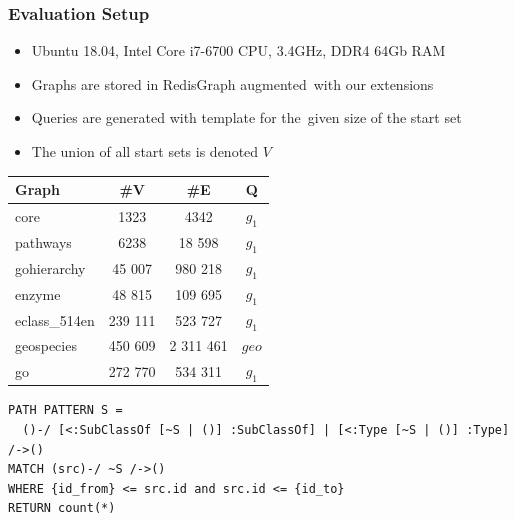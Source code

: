 \documentclass[xcolor=table,aspectratio=169]{beamer}
\begin{document}
\begin{frame}[fragile] \frametitle{Evaluation Setup}

\begin{minipage}[t]{0.51\textwidth}
\vspace{-2cm}
\begin{itemize}
  \item Ubuntu 18.04, Intel Core i7-6700 CPU, 3.4GHz, DDR4 64Gb RAM
  \item Graphs are stored in RedisGraph augmented~with our extensions
  \item Queries are generated with template for the~given size of the start set
  \item The union of all start sets is denoted $V$
\end{itemize}

\end{minipage}
\pause
\begin{minipage}[t]{0.44\textwidth}
{
\begin{tabular}{|l|c|c|c|}
\hline
Graph                  & \#V                  & \#E                  & Q     \\

\hline
\hline
core                   & 1323                 & 4342                 & $g_1$ \\
pathways               & 6238                 & 18 598               & $g_1$ \\
gohierarchy            & 45 007               & 980 218              & $g_1$ \\
enzyme                 & 48 815               & 109 695              & $g_1$ \\
eclass\_514en          & 239 111              & 523 727              & $g_1$ \\
geospecies             & 450 609              & 2 311 461            & $geo$ \\
go                     & 272 770              & 534 311              & $g_1$ \\
\hline
\end{tabular}
}

\end{minipage}

\vspace{1cm}
\pause
\begin{verbatim}
PATH PATTERN S =
  ()-/ [<:SubClassOf [~S | ()] :SubClassOf] | [<:Type [~S | ()] :Type] /->()
MATCH (src)-/ ~S /->()
WHERE {id_from} <= src.id and src.id <= {id_to}
RETURN count(*)

\end{verbatim}
\end{frame}
\end{document}

